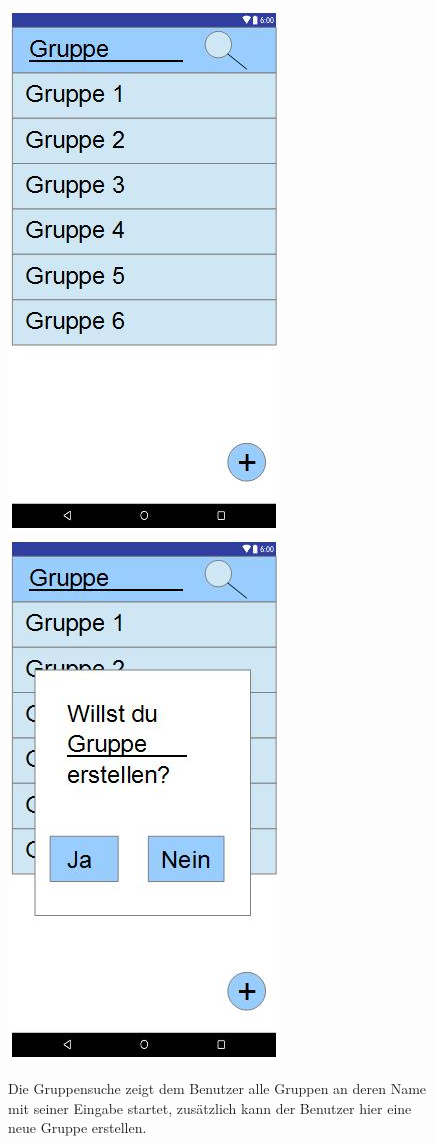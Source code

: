 \documentclass{scrartcl}
\begin{document}
	\newpage
	\begin{figure}[h]
		\includegraphics[width=.5\textwidth]{GUI_NeueGruppe.jpg}
		\includegraphics[width=.5\textwidth]{GUI_GruppeNeuBest.jpg}
		\caption{Die Gruppensuche zeigt dem Benutzer alle Gruppen an deren Name mit seiner Eingabe startet, zusätzlich kann der Benutzer hier eine neue Gruppe erstellen.}
	\end{figure}
	
\end{document}

